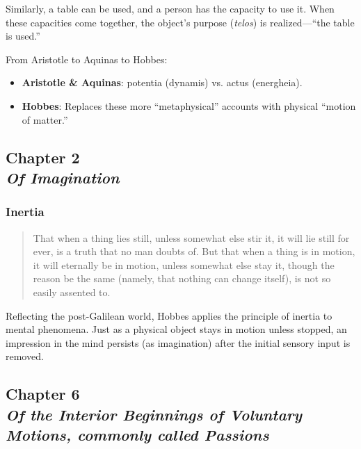             \begin{example}
                Similarly, a table can be used, and a person has the capacity to use it. When these capacities come together, the object’s purpose (\textit{telos}) is realized—“the table is used.”
            \end{example}

            From Aristotle to Aquinas to Hobbes:
            
            \begin{itemize}
                \item \textbf{Aristotle \& Aquinas}: potentia (dynamis) vs. actus (energheia).
                \item \textbf{Hobbes}: Replaces these more “metaphysical” accounts with physical “motion of matter.”
            \end{itemize}

    \subsection[Of Imagination]{Chapter 2 \\ \textit{Of Imagination}}

        \subsubsection{Inertia}

            \begin{quote}
                That when a thing lies still, unless somewhat else stir it, it will lie still for ever, is a truth that no man doubts of. But that when a thing is in motion, it will eternally be in motion, unless somewhat else stay it, though the reason be the same (namely, that nothing can change itself), is not so easily assented to.
            \end{quote}

            Reflecting the post-Galilean world, Hobbes applies the principle of inertia to mental phenomena. Just as a physical object stays in motion unless stopped, an impression in the mind persists (as imagination) after the initial sensory input is removed.

    \subsection[Of the Interior Beginnings of Voluntary Motions, commonly called Passions]{Chapter 6 \\ \textit{Of the Interior Beginnings of Voluntary Motions, commonly called Passions}}

